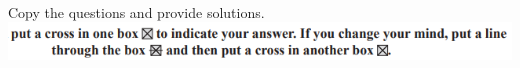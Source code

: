 \documentclass{article}
\date{}
\begin{document}
\fontsize{13}{15} \selectfont %

\begin{center}
  \qquad \\ 
\vspace{5pt}

\vspace{5pt}
    Copy the questions and provide solutions.   \\
\vspace{5pt}
    \includegraphics[width=15cm]{Year_6_Mixed_Tests/Xx.png}
\end{center}
\end{document}
